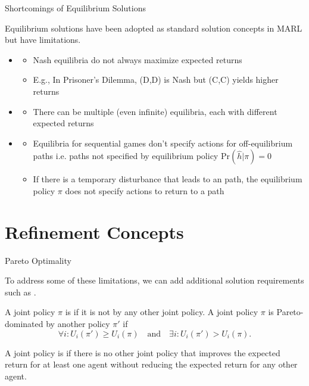 \begin{frame}{Shortcomings of Equilibrium Solutions}

Equilibrium solutions have been adopted as standard solution concepts in MARL but have limitations.
    
  \begin{itemize}
    \item<2-> 
      \begin{itemize}
        \item Nash equilibria do not always maximize expected returns
        \item E.g., In Prisoner’s Dilemma, (D,D) is Nash but (C,C) yields higher returns
      \end{itemize}
    \item<3-> 
      \begin{itemize}
        \item There can be multiple (even infinite) equilibria, each with different expected returns
      \end{itemize}
      \item<4-> 
      \begin{itemize}
        \item Equilibria for sequential games don't specify actions for off-equilibrium paths i.e. paths not specified by equilibrium policy \(\text{Pr}(\hat{h}|\pi) = 0\)
        \item If there is a temporary disturbance that leads to an  path, the equilibrium policy \(\pi\) does not specify actions to return to a  path
    \end{itemize}
  \end{itemize}
\end{frame}

\section{Refinement Concepts}

\begin{frame}{Pareto Optimality}

 To address some of these limitations, we can add additional solution requirements such as .
 
 A joint policy \(\pi\) is  if it is not  by any other joint policy. A joint policy \(\pi\) is Pareto-dominated by another policy \(\pi'\) if
 \begin{equation*}
     \forall i: U_i(\pi') \geq U_i(\pi) \quad \text{and} \quad \exists i: U_i(\pi') > U_i(\pi).
 \end{equation*}

\begin{intuitionbox}
    A joint policy is  if there is no other joint policy that improves the expected return for at least one agent without reducing the expected return for any other agent.
\end{intuitionbox}
\end{frame}


